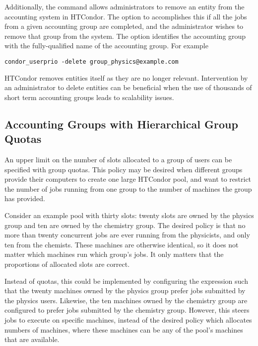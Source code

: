 Additionally, the  command allows administrators to
remove an entity from the accounting system in HTCondor.
The  option to 
accomplishes this
if all the jobs from a given accounting group are completed,
and the administrator wishes to remove that group from the system.
The  option
identifies the accounting group with the fully-qualified name
of the accounting group.
For example
\footnotesize
\begin{verbatim}
condor_userprio -delete group_physics@example.com
\end{verbatim}
\normalsize

HTCondor removes entities itself as they are no longer
relevant.
Intervention by an administrator to delete entities can
be beneficial when the use of thousands
of short term accounting groups leads to scalability
issues.

\subsection{\label{sec:group-quotas}Accounting Groups with Hierarchical Group Quotas}

An upper limit on the number of slots allocated to a group
of users can be specified with group quotas.  
This policy may be desired when different groups provide their computers
to create one large HTCondor pool, and want to restrict the number
of jobs running from one group to the number of machines the group
has provided.

Consider an example pool with thirty slots:
twenty slots are owned by the physics group and ten
are owned by the chemistry group.  The desired
policy is that no more than twenty concurrent jobs are ever running
from the physicists, and only ten from the chemists.
These machines are otherwise identical, so it does not matter
which machines run which group's jobs.
It only matters that the proportions of allocated slots are correct.

Instead of quotas, this could be implemented by configuring 
the  expression such that the twenty machines owned by 
the physics group prefer jobs submitted by the physics users.
Likewise, the ten machines owned by the chemistry group are configured 
to prefer jobs submitted by the chemistry group. 
However, this steers jobs to execute on specific machines, 
instead of the desired policy which allocates numbers of machines,
where these machines can be any of the pool's machines that are available.

